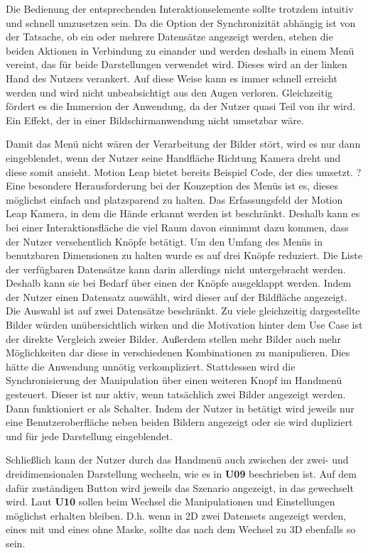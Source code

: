 Die Bedienung der entsprechenden Interaktionselemente sollte trotzdem intuitiv und schnell umzusetzen sein. Da die Option der Synchronizität abhängig ist von der Tatsache, ob ein oder mehrere Datensätze angezeigt werden, stehen die beiden Aktionen in Verbindung zu einander und werden deshalb in einem Menü vereint, das für beide Darstellungen verwendet wird. Dieses wird an der linken Hand des Nutzers verankert. Auf diese Weise kann es immer schnell erreicht werden und wird nicht unbeabsichtigt aus den Augen verloren. Gleichzeitig fördert es die Immersion der Anwendung, da der Nutzer quasi Teil von ihr wird. Ein Effekt, der in einer Bildschirmanwendung nicht umsetzbar wäre. 

Damit das Menü nicht wären der Verarbeitung der Bilder stört, wird es nur dann eingeblendet, wenn der Nutzer seine Handfläche Richtung Kamera dreht und diese somit ansieht. Motion Leap bietet bereits Beispiel Code, der dies umsetzt. ?
Eine besondere Herausforderung bei der Konzeption des Menüs ist es, dieses möglichst einfach und platzsparend zu halten. Das Erfassungsfeld der Motion Leap Kamera, in dem die Hände erkannt werden ist beschränkt. Deshalb kann es bei einer Interaktionsfläche die viel Raum davon einnimmt dazu kommen, dass der Nutzer versehentlich Knöpfe betätigt. 
Um den Umfang des Menüs in benutzbaren Dimensionen zu halten wurde es auf drei Knöpfe reduziert. 
Die Liste der verfügbaren Datensätze kann darin allerdings nicht untergebracht werden. Deshalb kann sie bei Bedarf über einen der Knöpfe ausgeklappt werden. 
Indem der Nutzer einen Datensatz auswählt, wird dieser auf der Bildfläche angezeigt. Die Auswahl ist auf zwei Datensätze beschränkt. Zu viele gleichzeitig dargestellte Bilder würden unübersichtlich wirken und die Motivation hinter dem Use Case ist der direkte Vergleich zweier Bilder. Außerdem stellen mehr Bilder auch mehr Möglichkeiten dar diese in verschiedenen Kombinationen zu manipulieren. Dies hätte die Anwendung unnötig verkompliziert. 
Stattdessen wird die Synchronisierung der Manipulation über einen weiteren Knopf im Handmenü gesteuert. Dieser ist nur aktiv, wenn tatsächlich zwei Bilder angezeigt werden. Dann funktioniert er als Schalter. Indem der Nutzer in betätigt wird jeweils nur eine Benutzeroberfläche neben beiden Bildern angezeigt oder sie wird dupliziert und für jede Darstellung eingeblendet. 
 
Schließlich kann der Nutzer durch das Handmenü auch zwischen der zwei- und dreidimensionalen Darstellung wechseln, wie es in \textbf{U09} beschrieben ist. Auf dem dafür zuständigen Button wird jeweils das Szenario angezeigt, in das gewechselt wird.
Laut \textbf{U10} sollen beim Wechsel die Manipulationen und Einstellungen möglichst erhalten bleiben. D.h. wenn in 2D zwei Datensets angezeigt werden, eines mit und eines ohne Maske, sollte das nach dem Wechsel zu 3D ebenfalls so sein. 

